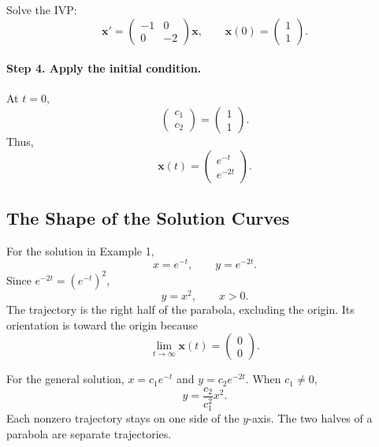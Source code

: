 \documentclass[10pt,letterpaper]{article}
\begin{document}
\begin{example}[1]{
Solve the IVP:
\[
\mathbf{x}'=
\begin{pmatrix}
-1&0\\
0&-2
\end{pmatrix}\mathbf{x},
\qquad
\mathbf{x}(0)=\begin{pmatrix}1\\1\end{pmatrix}.
\]
}
\paragraph{Step 4. Apply the initial condition.}
At $t=0$,
\[
\begin{pmatrix}c_1\\c_2\end{pmatrix}
=\begin{pmatrix}1\\1\end{pmatrix}.
\]
Thus,
\[
\boxed{
\mathbf{x}(t)=
\begin{pmatrix}
e^{-t}\\e^{-2t}
\end{pmatrix}.
}
\]
\end{example}

\subsection{The Shape of the Solution Curves}

For the solution in Example 1,
\[
x=e^{-t},\qquad y=e^{-2t}.
\]
Since $e^{-2t}=(e^{-t})^2$,
\[
\boxed{y=x^2,\qquad x>0.}
\]
The trajectory is the right half of the parabola,
excluding the origin. Its orientation is toward
the origin because
\[
\lim_{t\to\infty}\mathbf{x}(t)
=\begin{pmatrix}0\\0\end{pmatrix}.
\]

For the general solution, $x=c_1e^{-t}$ and
$y=c_2e^{-2t}$. When $c_1\ne0$,
\[
y=\frac{c_2}{c_1^2}x^2.
\]
Each nonzero trajectory stays on one side of
the $y$-axis. The two halves of a parabola are
separate trajectories.
\end{document}
